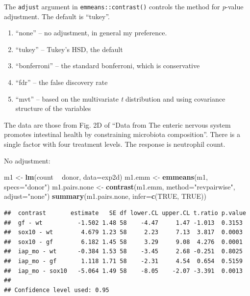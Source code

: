 \documentclass[]{book}
\newenvironment{Shaded}{\begin{snugshade}}{\end{snugshade}}
\newcommand{\KeywordTok}[1]{\textcolor[rgb]{0.13,0.29,0.53}{\textbf{#1}}}
\newcommand{\DataTypeTok}[1]{\textcolor[rgb]{0.13,0.29,0.53}{#1}}
\newcommand{\StringTok}[1]{\textcolor[rgb]{0.31,0.60,0.02}{#1}}
\newcommand{\OtherTok}[1]{\textcolor[rgb]{0.56,0.35,0.01}{#1}}
\newcommand{\OperatorTok}[1]{\textcolor[rgb]{0.81,0.36,0.00}{\textbf{#1}}}
\newcommand{\NormalTok}[1]{#1}
\providecommand{\tightlist}{%
  \setlength{\itemsep}{0pt}\setlength{\parskip}{0pt}}
\begin{document}
The \texttt{adjust} argument in \texttt{emmeans::contrast()} controls
the method for \emph{p}-value adjustment. The default is ``tukey''.

\begin{enumerate}
\def\labelenumi{\arabic{enumi}.}
\tightlist
\item
  ``none'' -- no adjustment, in general my preference.
\item
  ``tukey'' -- Tukey's HSD, the default
\item
  ``bonferroni'' -- the standard bonferroni, which is conservative
\item
  ``fdr'' -- the false discovery rate
\item
  ``mvt'' -- based on the multivariate \emph{t} distribution and using
  covariance structure of the variables
\end{enumerate}

The data are those from Fig. 2D of ``Data from The enteric nervous
system promotes intestinal health by constraining microbiota
composition''. There is a single factor with four treatment levels. The
response is neutrophil count.

No adjustment:

\begin{Shaded}
\begin{Highlighting}[]
\NormalTok{m1 <-}\StringTok{ }\KeywordTok{lm}\NormalTok{(count }\OperatorTok{~}\StringTok{ }\NormalTok{donor, }\DataTypeTok{data=}\NormalTok{exp2d)}
\NormalTok{m1.emm <-}\StringTok{ }\KeywordTok{emmeans}\NormalTok{(m1, }\DataTypeTok{specs=}\StringTok{"donor"}\NormalTok{)}
\NormalTok{m1.pairs.none <-}\StringTok{ }\KeywordTok{contrast}\NormalTok{(m1.emm, }\DataTypeTok{method=}\StringTok{"revpairwise"}\NormalTok{, }\DataTypeTok{adjust=}\StringTok{"none"}\NormalTok{)}
\KeywordTok{summary}\NormalTok{(m1.pairs.none, }\DataTypeTok{infer=}\KeywordTok{c}\NormalTok{(}\OtherTok{TRUE}\NormalTok{, }\OtherTok{TRUE}\NormalTok{))}
\end{Highlighting}
\end{Shaded}

\begin{verbatim}
##  contrast       estimate   SE df lower.CL upper.CL t.ratio p.value
##  gf - wt          -1.502 1.48 58    -4.47     1.47 -1.013  0.3153 
##  sox10 - wt        4.679 1.23 58     2.23     7.13  3.817  0.0003 
##  sox10 - gf        6.182 1.45 58     3.29     9.08  4.276  0.0001 
##  iap_mo - wt      -0.384 1.53 58    -3.45     2.68 -0.251  0.8025 
##  iap_mo - gf       1.118 1.71 58    -2.31     4.54  0.654  0.5159 
##  iap_mo - sox10   -5.064 1.49 58    -8.05    -2.07 -3.391  0.0013 
## 
## Confidence level used: 0.95
\end{verbatim}
\end{document}
